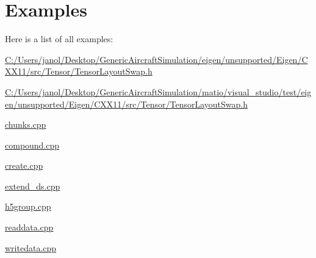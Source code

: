 \section{Examples}
Here is a list of all examples\+:\begin{DoxyCompactItemize}
\item 
\hyperlink{_c_1_2_users_2janol_2_desktop_2_generic_aircraft_simulation_2eigen_2unsupported_2_eigen_2_c_x_x1995ff76eaccdd7a9ea13b307626fb9df}{C\+:/\+Users/janol/\+Desktop/\+Generic\+Aircraft\+Simulation/eigen/unsupported/\+Eigen/\+C\+X\+X11/src/\+Tensor/\+Tensor\+Layout\+Swap.\+h}
\item 
\hyperlink{_c_1_2_users_2janol_2_desktop_2_generic_aircraft_simulation_2matio_2visual_studio_2test_2eigen_2286551beec45c5254494adb391cdc80f}{C\+:/\+Users/janol/\+Desktop/\+Generic\+Aircraft\+Simulation/matio/visual\+\_\+studio/test/eigen/unsupported/\+Eigen/\+C\+X\+X11/src/\+Tensor/\+Tensor\+Layout\+Swap.\+h}
\item 
\hyperlink{chunks_8cpp-example}{chunks.\+cpp}
\item 
\hyperlink{compound_8cpp-example}{compound.\+cpp}
\item 
\hyperlink{create_8cpp-example}{create.\+cpp}
\item 
\hyperlink{extend_ds_8cpp-example}{extend\+\_\+ds.\+cpp}
\item 
\hyperlink{h5group_8cpp-example}{h5group.\+cpp}
\item 
\hyperlink{readdata_8cpp-example}{readdata.\+cpp}
\item 
\hyperlink{writedata_8cpp-example}{writedata.\+cpp}
\end{DoxyCompactItemize}
